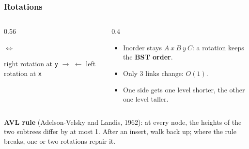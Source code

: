\documentclass[aspectratio=169,10pt,compress]{beamer}
\begin{document}




\begin{frame}[t,fragile] \frametitle{Rotations}
  \begin{columns}[T]
    \begin{column}{0.56\textwidth}
      \begin{center}
      \quad $\Longleftrightarrow$ \quad
      \end{center}
      \small right rotation at \texttt{y} $\to$ \quad $\leftarrow$ left rotation at \texttt{x}
    \end{column}
    \begin{column}{0.4\textwidth}
      \begin{itemize}\small
        \item Inorder stays $A\ x\ B\ y\ C$: a rotation keeps the \textbf{BST order}.
        \item Only 3 links change: $O(1)$.
        \item One side gets one level shorter, the other one level taller.
      \end{itemize}
    \end{column}
  \end{columns}
  \vspace{0.3em}
  \small \textbf{AVL rule} (Adelson-Velsky and Landis, 1962): at every node, the heights of the two subtrees differ by at most 1.
  After an insert, walk back up; where the rule breaks, one or two rotations repair it.
\end{frame}
\end{document}
